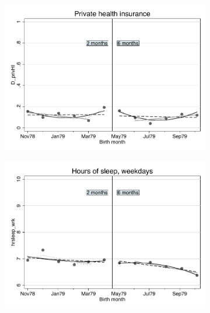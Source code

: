 \documentclass[a4paper ]{article}
\begin{document}
\begin{figure}[p]
\begin{subfigure}[h]{0.48\textwidth}\centering
	\includegraphics[width=\textwidth]{../../analysis/graphs/SOEP/D_privHI_RD.pdf}
\end{subfigure}
\quad
\begin{subfigure}[h]{0.48\textwidth}\centering
	\includegraphics[width=\textwidth]{../../analysis/graphs/SOEP/hrsleep_wrk_RD.pdf}
\end{subfigure}


\end{figure}
\end{document}
